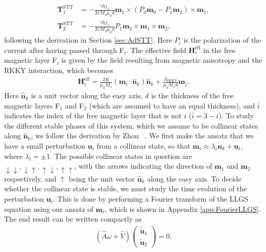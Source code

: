 \begin{subequations}
\begin{align}
    \mathbold{T}^{\text{STT}}_1 &= -\frac{\gamma \hbar j_x}{2 e M_s \mu_0 d} \mathbold{m}_1\times\left( P_0\mathbold{m}_0 - P_1 \mathbold{m}_2\right) \times \mathbold{m}_1, \\
    \mathbold{T}^{\text{STT}}_2 &= -\frac{\gamma \hbar j_x}{2 e M_s \mu_0 d} P_1 \mathbold{m}_2\times \mathbold{m}_1 \times \mathbold{m}_2,
\end{align}
\end{subequations}
following the derivation in Section \ref{sec:AdSTT}. Here $P_i$ is the polarization of the current after having passed through F$_i$. The effective field $\mathbold{H}^{\text{eff}}_i$ in the free magnetic layer F$_i$ is given by the field resulting from magnetic anisotropy and the RKKY interaction, which becomes
\begin{align}
    \mathbold{H}^{\text{eff}}_i = \frac{2K}{\mu_0 M_s}\left( \mathbold{m}_i \cdot \mathbold{\hat{n}}_k\right)\mathbold{\hat{n}}_k + \frac{J_{\text{RKKY}}}{\mu_0 M_s d} \mathbold{m}_{\bar{i}}.
\end{align}
Here $\mathbold{\hat{n}}_k$ is a unit vector along the easy axis, $d$ is the thickness of the free magnetic layers F$_1$ and F$_2$ (which are assumed to have an equal thickness), and $\bar{i}$ indicates the index of the free magnetic layer that is not $i$ ($\bar{i} = 3 - i$). To study the different stable phases of this system, which we assume to be collinear states along $\mathbold{\hat{n}}_k$, we follow the derivation by Zhou \etal~\cite{Zhou2013}. We first make the ansatz that we have a small perturbation $\mathbold{u}_i$ from a collinear state, so that $\mathbold{m}_i \approx \lambda_i\mathbold{\hat{n}}_k + \mathbold{u}_i$, where $\lambda_i = \pm 1$. The possible collinear states in question are $\downarrow\downarrow, \downarrow\uparrow, \uparrow\downarrow, \uparrow\uparrow$, with the arrows indicating the direction of $\mathbold{m}_1$ and $\mathbold{m}_2$ respectively, and $\uparrow$ being the unit vector $\mathbold{\hat{n}}_k$ along the easy axis. To decide whether the collinear state is stable, we must study the time evolution of the perturbation $\mathbold{u}_i$. This is done by performing a Fourier transform of the LLGS equation using our ansatz of $\mathbold{m}_i$, which is shown in Appendix \ref{app:FourierLLGS}. The end result can be written compactly as
\begin{align}
    \label{eq:EigenvalueEqn}
    \left(\hat{A}\omega + \hat{V}\right)
    \begin{pmatrix}
     \tilde{\mathbold{u}}_1 \\
     \tilde{\mathbold{u}}_2
    \end{pmatrix}
    = 0.
\end{align}
